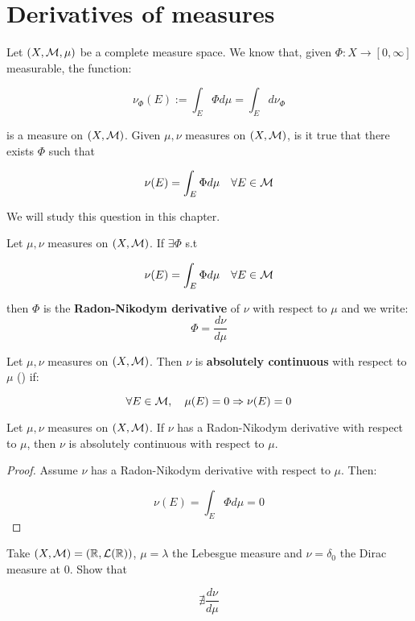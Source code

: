 \chapter{Derivatives of measures}

Let $(X, \mathcal{M}, \mu)$ be a complete measure space. We know
that, given $\Phi: X \to [0, \infty]$ measurable, the 
function:

$$\nu_{\Phi}(E) := \int_E \Phi d\mu = \int_E d \nu_{\Phi}$$

is a measure on $(X, \mathcal{M})$. Given $\mu, \nu$ measures on 
$(X, \mathcal{M})$, is it true that there exists $\Phi$ such that

$$\nu(E) = \int_E \Phi d\mu \quad \forall E \in \mathcal{M}$$

We will study this question in this chapter.

\begin{fdefinition}
    Let $\mu, \nu$ measures on $(X, \mathcal{M})$. If $\exists \Phi$ s.t 

    $$\nu(E) = \int_E \Phi d\mu \quad \forall E \in \mathcal{M}$$

    then $\Phi$ is the \textbf{Radon-Nikodym derivative} of $\nu$
    with respect to $\mu$ and we write:
    $$\Phi = \frac{d\nu}{d\mu}$$
\end{fdefinition}

\begin{fdefinition}
    Let $\mu, \nu$ measures on $(X, \mathcal{M})$. Then $\nu$ is \textbf{absolutely 
    continuous} with respect to $\mu$ (\say{$\nu << \mu$}) if:

    $$\forall E \in \mathcal{M}, \quad \mu(E) = 0 \Rightarrow \nu(E) = 0$$
\end{fdefinition}

\begin{flemma}
    Let $\mu, \nu$ measures on $(X, \mathcal{M})$. If $\nu$ has a Radon-Nikodym 
    derivative with respect to $\mu$, then $\nu$ is absolutely continuous 
    with respect to $\mu$.
\end{flemma}

\begin{proof}
    Assume $\nu$ has a Radon-Nikodym derivative with respect to $\mu$.
    Then:

    $$\nu(E) = \int_{E} \Phi d\mu = 0$$
\end{proof}

\begin{fexercise}
    Take $(X, \mathcal{M}) = (\mathbb{R} , \mathcal{L}(\mathbb{R}))$, $\mu = \lambda$ the Lebesgue
    measure and $\nu = \delta_0$ the Dirac measure at $0$. Show that

    $$\nexists \frac{d\nu}{d\mu}$$
\end{fexercise}


